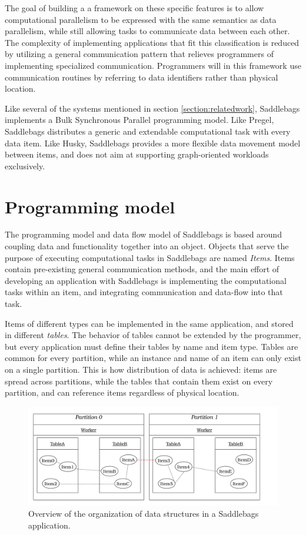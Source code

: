 \documentclass{uit-report}
\begin{document}
The goal of building a a framework on these specific features is to allow computational parallelism to be expressed with the same semantics as data parallelism, while still allowing tasks to communicate data between each other. The complexity of implementing applications that fit this classification is reduced by utilizing a general communication pattern that relieves programmers of implementing specialized communication. Programmers will in this framework use communication routines by referring to data identifiers rather than physical location.

Like several of the systems mentioned in section \ref{section:relatedwork}, Saddlebags implements a Bulk Synchronous Parallel programming model. Like Pregel, Saddlebags distributes a generic and extendable computational task with every data item. Like Husky, Saddlebags provides a more flexible data movement model between items, and does not aim at supporting graph-oriented workloads exclusively.

\section{Programming model}
The programming model and data flow model of Saddlebags is based around coupling data and functionality together into an object. Objects that serve the purpose of executing computational tasks in Saddlebags are named \emph{Items}. Items contain pre-existing general communication methods, and the main effort of developing an application with Saddlebags is implementing the computational tasks within an item, and integrating communication and data-flow into that task.

Items of different types can be implemented in the same application, and stored in different \emph{tables}. The behavior of tables cannot be extended by the programmer, but every application must define their tables by name and item type. Tables are common for every partition, while an instance and name of an item can only exist on a single partition. This is how distribution of data is achieved: items are spread across partitions, while the tables that contain them exist on every partition, and can reference items regardless of physical location.

\begin{figure}[h]
\centering
\includegraphics[width=14cm]{illustrations/basicmodel.pdf}
\caption{Overview of the organization of data structures in a Saddlebags application.}
\label{fig:basicmodel}
\end{figure}
\end{document}
